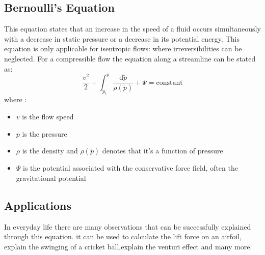 \subsection{Bernoulli's Equation}
{
This equation states that an increase in the speed of a fluid occurs simultaneously with a decrease in static pressure or a decrease in its potential energy. This equation is only applicable for isentropic flows: where irreversibilities can be neglected.
For a compressible flow the equation along a streamline can be stated as:
\begin{equation}
    \frac{v^2}{2} + \int_{p_{1}}^{p} {\frac{\mathrm{d}{\tilde{p}}}{\rho\left({\tilde{p}}\right)}} + \Psi ={\text{constant}}
\end{equation}
 where :
  \begin{itemize}
      \item $v$ is the flow speed
      \item $p$ is the pressure
      \item $\rho$ is the density and $\rho\left(\tilde{p}\right)$ denotes that it's a function of pressure
      \item $\Psi$ is the potential associated with the conservative force field, often the gravitational potential
  \end{itemize}
}
\subsection{Applications}
 {
 In everyday life there are many observations that can be successfully explained through this equation.
 it can be used to calculate the lift force on an airfoil, explain the swinging of a cricket ball,explain the venturi effect and many more.
 } 
